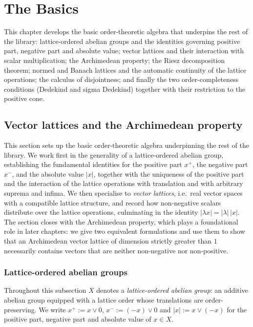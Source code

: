 \chapter{The Basics}

This chapter develops the basic order-theoretic algebra that
underpins the rest of the library: lattice-ordered abelian groups
and the identities governing positive part, negative part and
absolute value; vector lattices and their interaction with scalar
multiplication; the Archimedean property; the Riesz decomposition
theorem; normed and Banach lattices and the automatic continuity of
the lattice operations; the calculus of disjointness; and finally
the two order-completeness conditions (Dedekind and sigma Dedekind)
together with their restriction to the positive cone.

\section{Vector lattices and the Archimedean property}

This section sets up the basic order-theoretic algebra underpinning the
rest of the library. We work first in the generality of a lattice-ordered
abelian group, establishing the fundamental identities for the positive
part $x^+$, the negative part $x^-$, and the absolute value $\lvert x\rvert$,
together with the uniqueness of the positive part and the interaction of
the lattice operations with translation and with arbitrary suprema and
infima. We then specialise to \emph{vector lattices}, i.e.\ real vector
spaces with a compatible lattice structure, and record how non-negative
scalars distribute over the lattice operations, culminating in the identity
$\lvert \lambda x\rvert = \lvert \lambda\rvert\,\lvert x\rvert$. The section
closes with the Archimedean property, which plays a foundational role in
later chapters: we give two equivalent formulations and use them to show
that an Archimedean vector lattice of dimension strictly greater than
$1$ necessarily contains vectors that are neither non-negative nor
non-positive.

\subsection{Lattice-ordered abelian groups}

Throughout this subsection $X$ denotes a \emph{lattice-ordered abelian
group}: an additive abelian group equipped with a lattice order whose
translations are order-preserving. We write
$x^+ := x \vee 0$, $x^- := (-x) \vee 0$ and
$\lvert x \rvert := x \vee (-x)$ for the positive part, negative part
and absolute value of $x \in X$.

